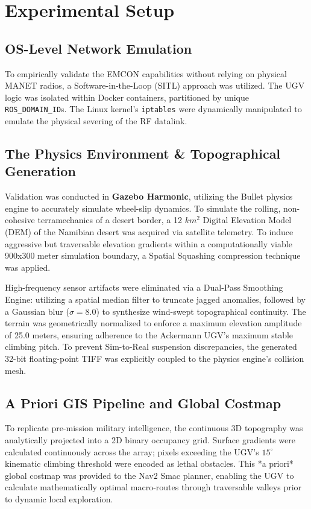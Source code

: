 \documentclass[conference]{IEEEtran}
\begin{document}
\section{Experimental Setup}

\subsection{OS-Level Network Emulation}
To empirically validate the EMCON capabilities without relying on physical MANET radios, a Software-in-the-Loop (SITL) approach was utilized. The UGV logic was isolated within Docker containers, partitioned by unique \texttt{ROS\_DOMAIN\_ID}s. The Linux kernel's \texttt{iptables} were dynamically manipulated to emulate the physical severing of the RF datalink.

\subsection{The Physics Environment \& Topographical Generation}
Validation was conducted in \textbf{Gazebo Harmonic}, utilizing the Bullet physics engine to accurately simulate wheel-slip dynamics. To simulate the rolling, non-cohesive terramechanics of a desert border, a 12 $km^2$ Digital Elevation Model (DEM) of the Namibian desert was acquired via satellite telemetry. To induce aggressive but traversable elevation gradients within a computationally viable 900x300 meter simulation boundary, a Spatial Squashing compression technique was applied. 

High-frequency sensor artifacts were eliminated via a Dual-Pass Smoothing Engine: utilizing a spatial median filter to truncate jagged anomalies, followed by a Gaussian blur ($\sigma=8.0$) to synthesize wind-swept topographical continuity. The terrain was geometrically normalized to enforce a maximum elevation amplitude of 25.0 meters, ensuring adherence to the Ackermann UGV's maximum stable climbing pitch. To prevent Sim-to-Real suspension discrepancies, the generated 32-bit floating-point TIFF was explicitly coupled to the physics engine's collision mesh.

\subsection{A Priori GIS Pipeline and Global Costmap}
To replicate pre-mission military intelligence, the continuous 3D topography was analytically projected into a 2D binary occupancy grid. Surface gradients were calculated continuously across the array; pixels exceeding the UGV's $15^\circ$ kinematic climbing threshold were encoded as lethal obstacles. This *a priori* global costmap was provided to the Nav2 Smac planner, enabling the UGV to calculate mathematically optimal macro-routes through traversable valleys prior to dynamic local exploration.
\end{document}
